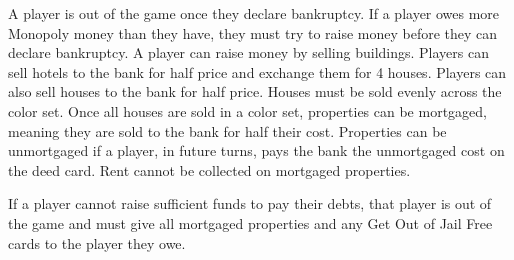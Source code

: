 A player is out of the game once they declare bankruptcy. If a player owes more Monopoly money than they have, they must try to raise money before they can declare bankruptcy. A player can raise money by selling buildings. Players can sell hotels to the bank for half price and exchange them for 4 houses. Players can also sell houses to the bank for half price. Houses must be sold evenly across the color set. Once all houses are sold in a color set, properties can be mortgaged, meaning they are sold to the bank for half their cost. Properties can be unmortgaged if a player, in future turns, pays the bank the unmortgaged cost on the deed card. Rent cannot be collected on mortgaged properties.

If a player cannot raise sufficient funds to pay their debts, that player is out of the game and must give all mortgaged properties and any Get Out of Jail Free cards to the player they owe.
